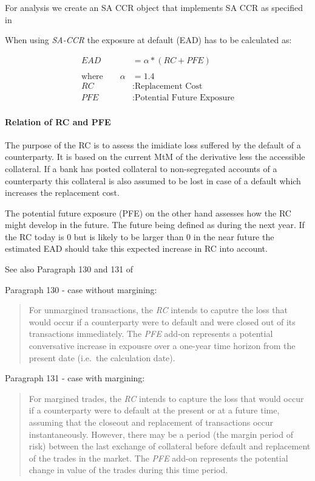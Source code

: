     

    
    For analysis we create an SA CCR object that implements SA CCR as
specified in \cite{SACCR}

    When using \emph{SA-CCR} the exposure at default (EAD) has to be
calculated as:

\begin{align*}
EAD &= \alpha * (RC + PFE)\\
\\
\text{where} \qquad \alpha&=1.4 \\
RC&: \text{Replacement Cost} \\
PFE&: \text{Potential Future Exposure}
\end{align*}

    \hypertarget{relation-of-rc-and-pfe}{%
\paragraph{Relation of RC and PFE}\label{relation-of-rc-and-pfe}}

The purpose of the RC is to assess the imidiate loss suffered by the
default of a counterparty. It is based on the current MtM of the
derivative less the accessible collateral. If a bank has posted
collateral to non-segregated accounts of a counterparty this collateral
is also assumed to be lost in case of a default which increases the
replacement cost.

The potential future exposure (PFE) on the other hand assesses how the
RC might develop in the future. The future being defined as during the
next year. If the RC today is 0 but is likely to be larger than 0 in the
near future the estimated EAD should take this expected increase in RC
into account.

See also Paragraph 130 and 131 of \cite{SACCR}

    Paragraph 130 - case without margining:

\begin{quote}
For unmargined transactions, the \emph{RC} intends to caputre the loss
that would occur if a counterparty were to default and were closed out
of its transactions immediately. The \emph{PFE} add-on represents a
potential conversative increase in expousre over a one-year time horizon
from the present date (i.e.~the calculation date).
\end{quote}

Paragraph 131 - case with margining:

\begin{quote}
For margined trades, the \emph{RC} intends to capture the loss that
would occur if a counterparty were to default at the present or at a
future time, assuming that the closeout and replacement of transactions
occur instantaneously. However, there may be a period (the margin period
of risk) between the last exchange of collateral before default and
replacement of the trades in the market. The \emph{PFE} add-on
represents the potential change in value of the trades during this time
period.
\end{quote}

